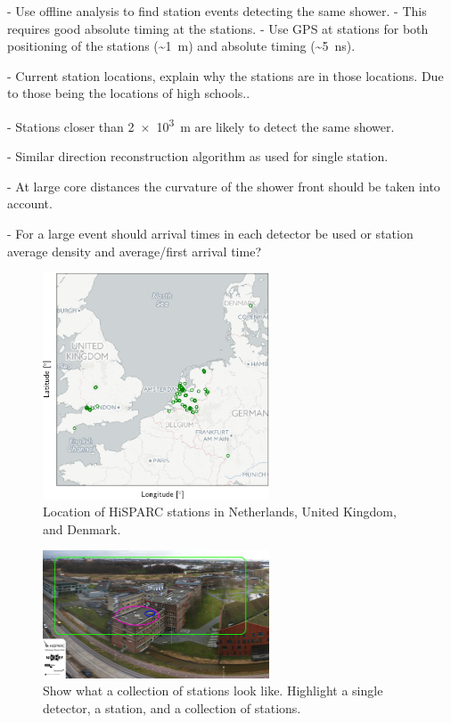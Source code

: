 - Use offline analysis to find station events detecting the same shower.
    - This requires good absolute timing at the stations.
    - Use GPS at stations for both positioning of the stations (\SI{~1}{\meter}) and absolute timing (\SI{~5}{\ns}).

- Current station locations, explain why the stations are in those locations. Due to those being the locations of high schools..

- Stations closer than \SI{2e3}{\meter} are likely to detect the same shower.

- Similar direction reconstruction algorithm as used for single station.

- At large core distances the curvature of the shower front should be taken into account.

- For a large event should arrival times in each detector be used or station average density and average/first arrival time?

\begin{figure}
    \centering
    \includegraphics[width=0.6\textwidth]
                    {plots/experiment/network}
    \caption{Location of HiSPARC stations in Netherlands, United Kingdom, and Denmark.}
    \label{fig:network}
\end{figure}


\begin{figure}
    \centering
    \includegraphics[width=0.6\textwidth]
                    {plots/experiment/ADL_151373_151429_layers.jpg}
    \caption{Show what a collection of stations look like. Highlight a single detector, a station, and a collection of stations.}
    \label{fig:ADL_151373_151429_layers}
\end{figure}


